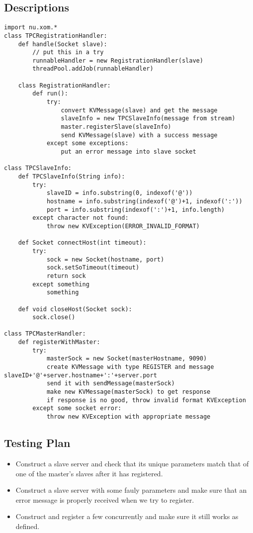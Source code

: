 \subsection{Descriptions}
\begin{verbatim}
import nu.xom.*
class TPCRegistrationHandler:
    def handle(Socket slave):
        // put this in a try
        runnableHandler = new RegistrationHandler(slave)
        threadPool.addJob(runnableHandler)

    class RegistrationHandler:
        def run():
            try:
                convert KVMessage(slave) and get the message
                slaveInfo = new TPCSlaveInfo(message from stream)
                master.registerSlave(slaveInfo)
                send KVMessage(slave) with a success message
            except some exceptions:
                put an error message into slave socket

class TPCSlaveInfo:
    def TPCSlaveInfo(String info):
        try:
            slaveID = info.substring(0, indexof('@'))
            hostname = info.substring(indexof('@')+1, indexof(':'))
            port = info.substring(indexof(':')+1, info.length)
        except character not found:
            throw new KVException(ERROR_INVALID_FORMAT)

    def Socket connectHost(int timeout):
        try:
            sock = new Socket(hostname, port)
            sock.setSoTimeout(timeout)
            return sock
        except something
            something

    def void closeHost(Socket sock):
        sock.close()

class TPCMasterHandler:
    def registerWithMaster:
        try:
            masterSock = new Socket(masterHostname, 9090)
            create KVMessage with type REGISTER and message slaveID+'@'+server.hostname+':'+server.port
            send it with sendMessage(masterSock)
            make new KVMessage(masterSock) to get response
            if response is no good, throw invalid format KVException
        except some socket error:
            throw new KVException with appropriate message

\end{verbatim}
\subsection{Testing Plan}
\begin{itemize}
\item Construct a slave server and check that its unique parameters match that of one of the master's slaves after it has registered.
\item Construct a slave server with some fauly parameters and make sure that an error message is properly received when we try to register.
\item Construct and register a few concurrently and make sure it still works as defined.
\end{itemize}
